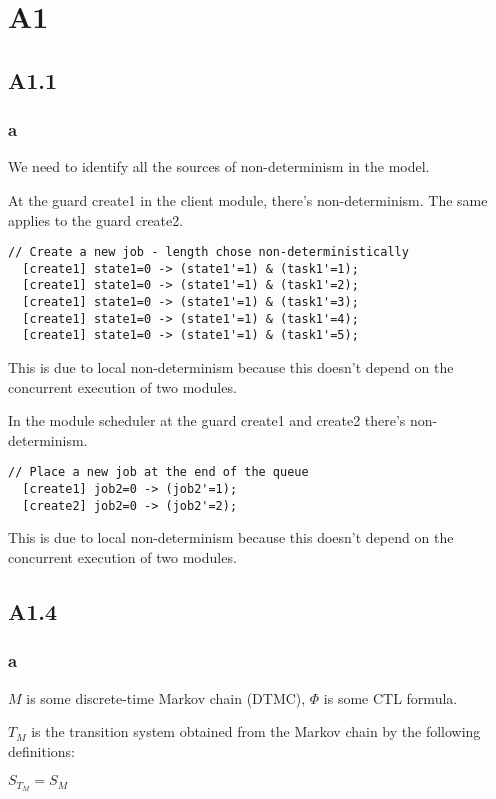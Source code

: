 
\section{A1}

\subsection{A1.1}

\subsubsection{a}

We need to identify all the sources of non-determinism in the model. 

At the guard create1 in the client module, there's non-determinism. The same applies to the guard create2.
\begin{verbatim}
// Create a new job - length chose non-deterministically
  [create1] state1=0 -> (state1'=1) & (task1'=1);
  [create1] state1=0 -> (state1'=1) & (task1'=2);
  [create1] state1=0 -> (state1'=1) & (task1'=3);
  [create1] state1=0 -> (state1'=1) & (task1'=4);
  [create1] state1=0 -> (state1'=1) & (task1'=5);
\end{verbatim}
This is due to local non-determinism because this doesn't depend on the concurrent execution of two modules.

In the module scheduler at the guard create1 and create2 there's non-determinism.
\begin{verbatim}
// Place a new job at the end of the queue
  [create1] job2=0 -> (job2'=1);
  [create2] job2=0 -> (job2'=2);
\end{verbatim}
This is due to local non-determinism because this doesn't depend on the concurrent execution of two modules.

\subsection{A1.4}

\subsubsection{a}

$M$ is some discrete-time Markov chain (DTMC),
$\Phi$ is some CTL formula.

$T_M$ is the transition system obtained from the Markov chain
by the following definitions:

$S_{T_M} = S_M$

